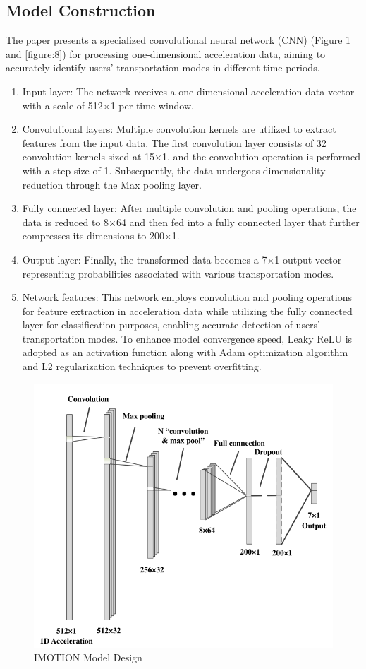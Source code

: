 \documentclass[12pt,two side]{report}
\begin{document}
\subsection{Model Construction}
The paper presents a specialized convolutional neural network (CNN) (Figure \ref{figure:7} and \ref{figure:8}) for processing one-dimensional acceleration data, aiming to accurately identify users' transportation modes in different time periods.
\begin{enumerate}
    \item Input layer: The network receives a one-dimensional acceleration data vector with a scale of 512×1 per time window.
    \item Convolutional layers: Multiple convolution kernels are utilized to extract features from the input data. The first convolution layer consists of 32 convolution kernels sized at 15×1, and the convolution operation is performed with a step size of 1. Subsequently, the data undergoes dimensionality reduction through the Max pooling layer.
    \item Fully connected layer: After multiple convolution and pooling operations, the data is reduced to 8×64 and then fed into a fully connected layer that further compresses its dimensions to 200×1.
    \item Output layer: Finally, the transformed data becomes a 7×1 output vector representing probabilities associated with various transportation modes.
    \item Network features: This network employs convolution and pooling operations for feature extraction in acceleration data while utilizing the fully connected layer for classification purposes, enabling accurate detection of users' transportation modes. To enhance model convergence speed, Leaky ReLU is adopted as an activation function along with Adam optimization algorithm and L2 regularization techniques to prevent overfitting.
\end{enumerate}
\begin{figure}
\centering
\includegraphics[width=16cm]{background_report/figures/model.png}
\caption{IMOTION Model Design\cite{liang2019deep}}
\label{figure:7}
\end{figure}
\end{document}
